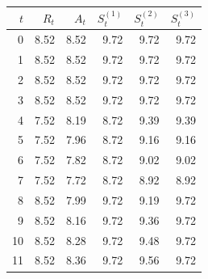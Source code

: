 \begin{tabular}{rrrrrr}
\toprule
$t$ & $R_t$ & $A_t$ & $S^{(1)}_t$ & $S^{(2)}_t$ & $S^{(3)}_t$ \\
\midrule
0 & 8.52 & 8.52 & 9.72 & 9.72 & 9.72 \\
1 & 8.52 & 8.52 & 9.72 & 9.72 & 9.72 \\
2 & 8.52 & 8.52 & 9.72 & 9.72 & 9.72 \\
3 & 8.52 & 8.52 & 9.72 & 9.72 & 9.72 \\
4 & 7.52 & 8.19 & 8.72 & 9.39 & 9.39 \\
5 & 7.52 & 7.96 & 8.72 & 9.16 & 9.16 \\
6 & 7.52 & 7.82 & 8.72 & 9.02 & 9.02 \\
7 & 7.52 & 7.72 & 8.72 & 8.92 & 8.92 \\
8 & 8.52 & 7.99 & 9.72 & 9.19 & 9.72 \\
9 & 8.52 & 8.16 & 9.72 & 9.36 & 9.72 \\
10 & 8.52 & 8.28 & 9.72 & 9.48 & 9.72 \\
11 & 8.52 & 8.36 & 9.72 & 9.56 & 9.72 \\
\bottomrule
\end{tabular}